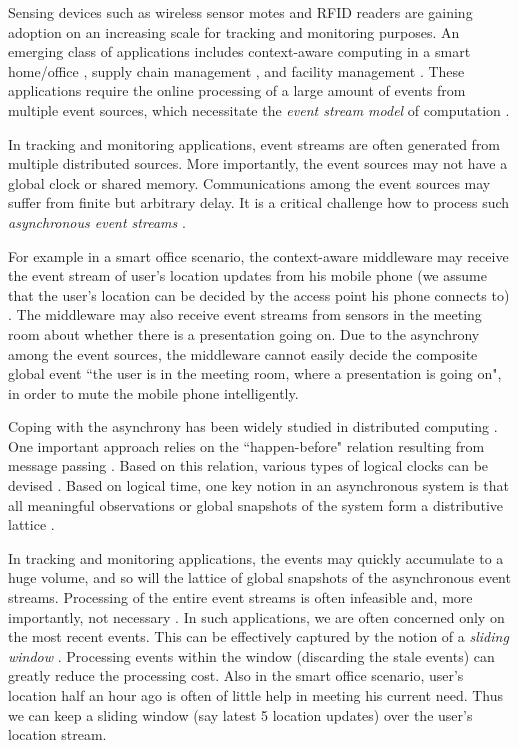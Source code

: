 \documentclass[12pt,journal,letterpaper,compsoc]{IEEEtran}
\begin{document}
Sensing devices such as wireless sensor motes and RFID readers are gaining adoption on an increasing scale for tracking and monitoring purposes. An emerging class of applications includes context-aware computing in a smart home/office \cite{Huang09, Huang11}, supply chain management \cite{Niederman07}, and facility management \cite{Wu06}. These applications require the online processing of a large amount of events from multiple event sources, which necessitate the {\it event stream model} of computation \cite{Tirthapura06, Wu06}.

In tracking and monitoring applications, event streams are often generated from multiple distributed sources. More importantly, the event sources may not have a global clock or shared memory. Communications among the event sources may suffer from finite but arbitrary delay. It is a critical challenge how to process such {\it asynchronous event streams}  \cite{Tirthapura06, Huang09, Huang11}.

For example in a smart office scenario, the context-aware middleware may receive the event stream of user's location updates from his mobile phone (we assume that the user's location can be decided by the access point his phone connects to) \cite{Huang09, Huang11}. The middleware may also receive event streams from sensors in the meeting room about whether there is a presentation going on. Due to the asynchrony among the event sources, the middleware cannot easily decide the composite global event ``the user is in the meeting room, where a presentation is going on", in order to mute the mobile phone intelligently.

Coping with the asynchrony has been widely studied in distributed computing \cite{Babaoglu93, Schwarz94}. One important approach relies on the ``happen-before" relation resulting from message passing \cite{Lamport78}. Based on this relation, various types of logical clocks can be devised \cite{Schwarz94, Mattern89}. Based on logical time, one key notion in an asynchronous system is that all meaningful observations or global snapshots of the system form a distributive lattice \cite{Babaoglu93, Schwarz94}.

In tracking and monitoring applications, the events may quickly accumulate to a huge volume, and so will the lattice of global snapshots of the asynchronous event streams\cite{Schwarz94, Jard94}. Processing of the entire event streams is often infeasible and, more importantly, not necessary \cite{Braverman11}. In such applications, we are often concerned only on the most recent events. This can be effectively captured by the notion of a {\it sliding window} \cite{Datar02, Tirthapura06, Braverman11}. Processing events within the window (discarding the stale events) can greatly reduce the processing cost. Also in the smart office scenario, user's location half an hour ago is often of little help in meeting his current need. Thus we can keep a sliding window (say latest 5 location updates) over the user's location stream.
\end{document}
